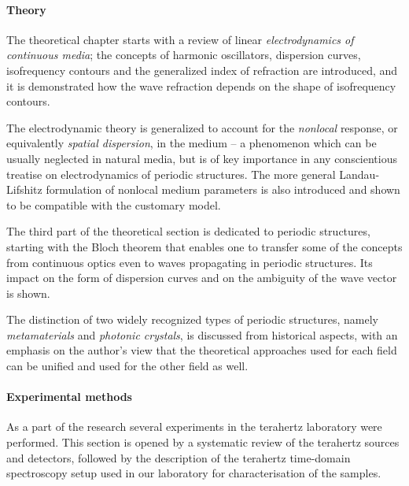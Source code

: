 \paragraph{Theory} %
The theoretical chapter starts with a review of linear \textit{electrodynamics of continuous media}; the concepts of harmonic oscillators, dispersion curves, isofrequency contours and  the generalized index of refraction are introduced, and it is demonstrated how the wave refraction depends on the shape of isofrequency contours.

The electrodynamic theory is generalized to account for the \textit{nonlocal} response, or equivalently \textit{spatial dispersion}, in the medium -- a phenomenon which can be usually neglected in natural media, but is of key importance in any conscientious treatise on electrodynamics of periodic structures.
The more general Landau-Lifshitz formulation of nonlocal medium parameters is also introduced and shown to be compatible with the customary model.  

The third part of the theoretical section is dedicated to periodic structures, starting with the Bloch theorem that enables one to transfer some of the concepts from continuous optics even to waves propagating in periodic structures. Its impact on the form of dispersion curves and on the ambiguity of the wave vector is shown.

The distinction of two widely recognized types of periodic structures, namely \textit{metamaterials} and \textit{photonic crystals}, is discussed from historical
aspects, with an emphasis on the author's view that the theoretical approaches used for each field can be unified and used for the other field as well.

\paragraph{Experimental methods} %
As a part of the research several experiments in the terahertz laboratory were performed. This section is opened by a systematic review of the terahertz sources and detectors, followed by the description of the terahertz time-domain spectroscopy setup used in our laboratory for characterisation of the samples. 

